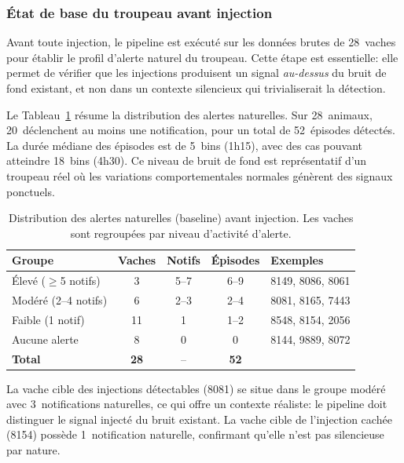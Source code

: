 \subsubsection{État de base du troupeau avant injection}

Avant toute injection, le pipeline est exécuté sur les données brutes de 28~vaches pour
établir le profil d'alerte naturel du troupeau. Cette étape est essentielle: elle
permet de vérifier que les injections produisent un signal \textit{au-dessus} du bruit
de fond existant, et non dans un contexte silencieux qui trivialiserait la détection.

Le Tableau~\ref{tab:baseline_troupeau} résume la distribution des alertes naturelles.
Sur 28~animaux, 20~déclenchent au moins une notification, pour un total de 52~épisodes
détectés. La durée médiane des épisodes est de 5~bins (1h15), avec des cas pouvant
atteindre 18~bins (4h30). Ce niveau de bruit de fond est représentatif d'un troupeau
réel où les variations comportementales normales génèrent des signaux ponctuels.

\begin{table}[H]
    \centering
    \caption{Distribution des alertes naturelles (baseline) avant injection.
    Les vaches sont regroupées par niveau d'activité d'alerte.}
    \label{tab:baseline_troupeau}
    \small
    \begin{tabular}{lcccl}
        \toprule
        \textbf{Groupe} & \textbf{Vaches} & \textbf{Notifs}
            & \textbf{Épisodes} & \textbf{Exemples} \\
        \midrule
        Élevé ($\geq$5 notifs)   & 3  & 5--7  & 6--9  & 8149, 8086, 8061 \\
        Modéré (2--4 notifs)     & 6  & 2--3  & 2--4  & 8081, 8165, 7443 \\
        Faible (1 notif)         & 11 & 1     & 1--2  & 8548, 8154, 2056 \\
        Aucune alerte            & 8  & 0     & 0     & 8144, 9889, 8072 \\
        \midrule
        \textbf{Total}           & \textbf{28} & -- & \textbf{52} & \\
        \bottomrule
    \end{tabular}
\end{table}

La vache cible des injections détectables (8081) se situe dans le groupe modéré avec
3~notifications naturelles, ce qui offre un contexte réaliste: le pipeline doit
distinguer le signal injecté du bruit existant. La vache cible de l'injection cachée
(8154) possède 1~notification naturelle, confirmant qu'elle n'est pas silencieuse
par nature.

